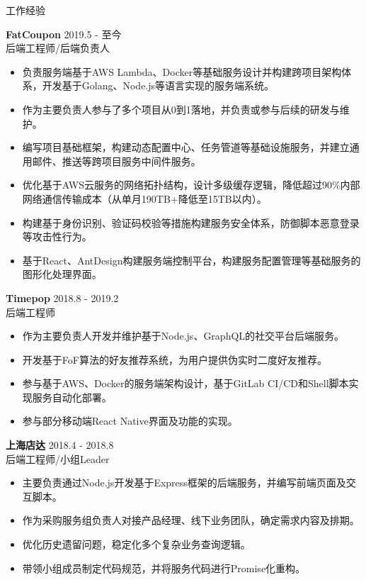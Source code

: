 \documentclass{resume} %
\begin{document}
\begin{rSection}{工作经验}

\textbf{FatCoupon} \hfill 2019.5 - 至今\\
后端工程师/后端负责人 \hfill \textit{}
\begin{itemize}
  \itemsep -3pt {}
  \item 负责服务端基于AWS Lambda、Docker等基础服务设计并构建跨项目架构体系，开发基于Golang、Node.js等语言实现的服务端系统。
  \item 作为主要负责人参与了多个项目从0到1落地，并负责或参与后续的研发与维护。
  \item 编写项目基础框架，构建动态配置中心、任务管道等基础设施服务，并建立通用邮件、推送等跨项目服务中间件服务。
  \item 优化基于AWS云服务的网络拓扑结构，设计多级缓存逻辑，降低超过90\%内部网络通信传输成本（从单月190TB+降低至15TB以内）。
  \item 构建基于身份识别、验证码校验等措施构建服务安全体系，防御脚本恶意登录等攻击性行为。
  \item 基于React、AntDesign构建服务端控制平台，构建服务配置管理等基础服务的图形化处理界面。
\end{itemize}

\textbf{Timepop} \hfill 2018.8 - 2019.2\\
后端工程师 \hfill \textit{}
\begin{itemize}
  \itemsep -3pt {}
  \item 作为主要负责人开发并维护基于Node.js、GraphQL的社交平台后端服务。
  \item 开发基于FoF算法的好友推荐系统，为用户提供伪实时二度好友推荐。
  \item 参与基于AWS、Docker的服务端架构设计，基于GitLab CI/CD和Shell脚本实现服务自动化部署。
  \item 参与部分移动端React Native界面及功能的实现。
\end{itemize}

\textbf{上海店达} \hfill 2018.4 - 2018.8\\
后端工程师/小组Leader \hfill \textit{}
\begin{itemize}
  \itemsep -3pt {}
  \item 主要负责通过Node.js开发基于Express框架的后端服务，并编写前端页面及交互脚本。
  \item 作为采购服务组负责人对接产品经理、线下业务团队，确定需求内容及排期。
  \item 优化历史遗留问题，稳定化多个复杂业务查询逻辑。
  \item 带领小组成员制定代码规范，并将服务代码进行Promise化重构。
\end{itemize}


\end{rSection}
\end{document}
